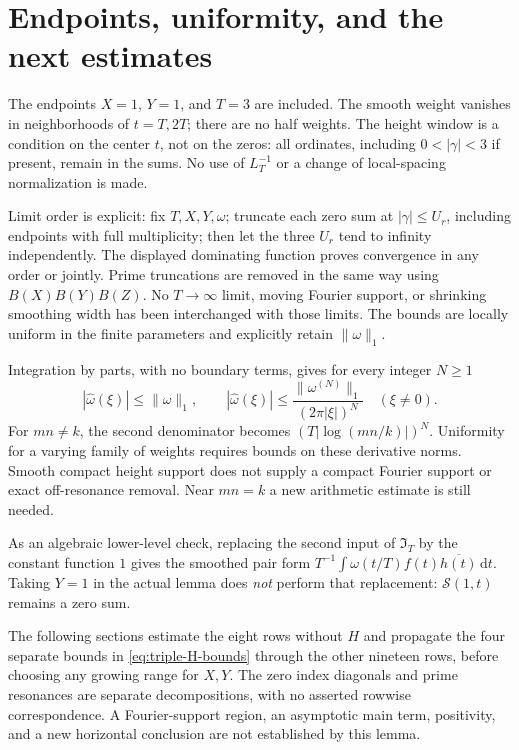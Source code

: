 \documentclass[11pt]{article}
\newcommand{\ZS}{\mathcal S}
\newcommand{\IT}{\mathfrak I_T}
\newcommand{\dd}{\,\mathrm d}
\begin{document}
\section{Endpoints, uniformity, and the next estimates}

The endpoints \(X=1\), \(Y=1\), and \(T=3\) are included. The smooth
weight vanishes in neighborhoods of \(t=T,2T\); there are no half weights.
The height window is a condition on the center \(t\), not on the zeros:
all ordinates, including \(0<|\gamma|<3\) if present, remain in the sums.
No use of \(L_T^{-1}\) or a change of local-spacing normalization is made.

Limit order is explicit: fix \(T,X,Y,\omega\); truncate each zero sum at
\(|\gamma|\leq U_r\), including endpoints with full multiplicity; then let
the three \(U_r\) tend to infinity independently. The displayed dominating
function proves convergence in any order or jointly. Prime truncations
are removed in the same way using \(B(X)B(Y)B(Z)\).
No \(T\to\infty\) limit, moving Fourier support, or shrinking smoothing
width has been interchanged with those limits. The bounds are locally
uniform in the finite parameters and explicitly retain \(\|\omega\|_1\).

Integration by parts, with no boundary terms, gives for every integer
\(N\geq1\)
\begin{equation}\label{eq:triple-decay}
 |\widehat\omega(\xi)|\leq\|\omega\|_1,\qquad
 |\widehat\omega(\xi)|\leq
 \frac{\|\omega^{(N)}\|_1}{(2\pi|\xi|)^N}\quad(\xi\ne0).
\end{equation}
For \(mn\ne k\), the second denominator becomes
\((T|\log(mn/k)|)^N\). Uniformity for a varying family of weights
requires bounds on these derivative norms. Smooth compact height support
does not supply a compact Fourier support or exact off-resonance removal.
Near \(mn=k\) a new arithmetic estimate is still needed.

As an algebraic lower-level check, replacing the second input of \(\IT\)
by the constant function \(1\) gives the smoothed pair form
\(T^{-1}\int\omega(t/T)f(t)\overline{h(t)}\dd t\).
Taking \(Y=1\) in the actual lemma does \emph{not} perform that replacement:
\(\ZS(1,t)\) remains a zero sum.

The following sections estimate the eight rows without \(H\) and propagate
the four separate bounds in \eqref{eq:triple-H-bounds} through the other
nineteen rows, before choosing any growing range for \(X,Y\). The zero
index diagonals and prime resonances are separate decompositions, with
no asserted rowwise correspondence. A Fourier-support region, an
asymptotic main term, positivity, and a new horizontal conclusion are
not established by this lemma.
\end{document}
